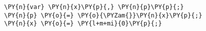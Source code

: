 \begin{Verbatim}[commandchars=\\\{\}]
\PY{n}{var} \PY{n}{x}\PY{p}{,} \PY{n}{p}\PY{p}{;}
\PY{n}{p} \PY{o}{=} \PY{o}{\PYZam{}}\PY{n}{x}\PY{p}{;}
\PY{n}{x} \PY{o}{=} \PY{l+m+mi}{0}\PY{p}{;}
\end{Verbatim}

